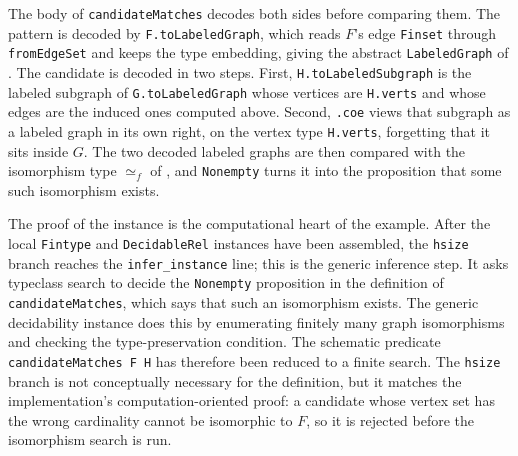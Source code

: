 \documentclass{article}
\newcommand{\lean}[1]{\texttt{#1}}
\begin{document}
The body of \lean{candidateMatches} decodes both sides before comparing them.
The pattern is decoded by \lean{F.toLabeledGraph}, which reads \(F\)'s edge
\lean{Finset} through \lean{fromEdgeSet} and keeps the type embedding, giving
the abstract \lean{LabeledGraph} of .  The candidate is
decoded in two steps.  First, \lean{H.toLabeledSubgraph} is the labeled
subgraph of \lean{G.toLabeledGraph} whose vertices are \lean{H.verts} and whose
edges are the induced ones computed above.  Second, \lean{.coe} views that
subgraph as a labeled graph in its own right, on the vertex type
\lean{H.verts}, forgetting that it sits inside \(G\).  The two decoded labeled
graphs are then compared with the isomorphism type \(\simeq_f\) of
, and \lean{Nonempty} turns it into the proposition that
some such isomorphism exists.

The proof of the instance is the computational heart of the example.  After the
local \lean{Fintype} and \lean{DecidableRel} instances have been assembled, the
\lean{hsize} branch reaches the \lean{infer\_instance} line; this is the
generic inference step.  It asks typeclass search to decide the
\lean{Nonempty} proposition in the definition of \lean{candidateMatches}, which
says that such an isomorphism exists.  The generic decidability instance does
this by enumerating finitely many graph isomorphisms and checking the
type-preservation condition.
The schematic predicate \lean{candidateMatches~F~H} has therefore been reduced
to a finite search.  The \lean{hsize} branch is not conceptually necessary for the
definition, but it matches the implementation's computation-oriented proof: a
candidate whose vertex set has the wrong cardinality cannot be isomorphic to
\(F\), so it is rejected before the isomorphism search is run.
\end{document}
